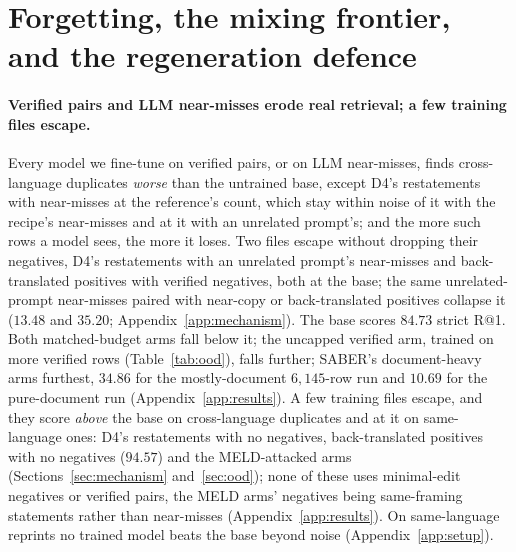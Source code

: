 \section{Forgetting, the mixing frontier, and the regeneration defence}
\label{sec:forgetting}
\label{sec:discussion}

\paragraph{Verified pairs and LLM near-misses erode real retrieval; a few training files escape.}
Every model we fine-tune on verified pairs, or on LLM near-misses, finds cross-language duplicates \emph{worse} than the untrained base, except D4's restatements with near-misses at the reference's count, which stay within noise of it with the recipe's near-misses and at it with an unrelated prompt's; and the more such rows a model sees, the more it loses. Two files escape without dropping their negatives, D4's restatements with an unrelated prompt's near-misses and back-translated positives with verified negatives, both at the base; the same unrelated-prompt near-misses paired with near-copy or back-translated positives collapse it ($13.48$ and $35.20$; Appendix~\ref{app:mechanism}). The base scores $84.73$ strict R@1. Both matched-budget arms fall below it; the uncapped verified arm, trained on more verified rows (Table~\ref{tab:ood}), falls further; SABER's document-heavy arms furthest, $34.86$ for the mostly-document $6{,}145$-row run and $10.69$ for the pure-document run (Appendix~\ref{app:results}). A few training files escape, and they score \emph{above} the base on cross-language duplicates and at it on same-language ones: D4's restatements with no negatives, back-translated positives with no negatives ($94.57$) and the MELD-attacked arms (Sections~\ref{sec:mechanism} and~\ref{sec:ood}); none of these uses minimal-edit negatives or verified pairs, the MELD arms' negatives being same-framing statements rather than near-misses (Appendix~\ref{app:results}). On same-language reprints no trained model beats the base beyond noise (Appendix~\ref{app:setup}).

